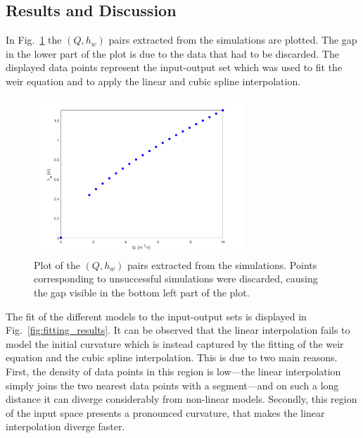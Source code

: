 \subsection{Results and Discussion}

In Fig.~\ref{fig:simulations_results} the $(Q, h_w)$ pairs extracted from the simulations are plotted.
The gap in the lower part of the plot is due to the data that had to be discarded.
The displayed data points represent the input-output set which was used to fit the weir equation and to apply the  linear and cubic spline interpolation.

\begin{figure}[h]
  \centering
  \includegraphics[width=0.7\textwidth]{Figures/simulations_results.png}
  \caption{Plot of the $(Q, h_w)$ pairs extracted from the simulations. Points corresponding to unsuccessful simulations were discarded, causing the gap visible in the bottom left part of the plot.}
  \label{fig:simulations_results}
\end{figure}

The fit of the different models to the input-output sets is displayed in Fig.~\ref{fig:fitting_results}.
It can be observed that the linear interpolation fails to model the initial curvature which is instead captured by the fitting of the weir equation and the cubic spline interpolation.
This is due to two main reasons. 
First, the density of data points in this region is low---the linear interpolation simply joins the two nearest data points with a segment---and on such a long distance it can diverge considerably from non-linear models.
Secondly, this region of the input space presents a pronounced curvature, that makes the linear interpolation diverge faster.

